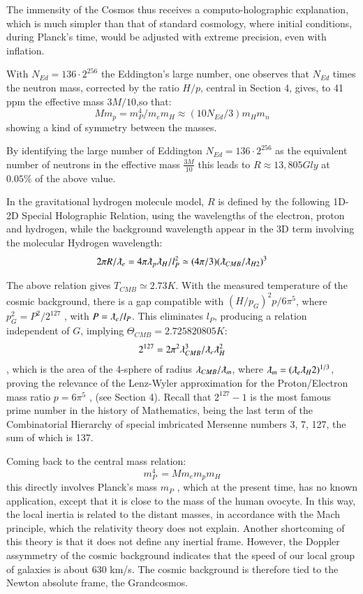 \documentclass[twoside,draft]{article}
\begin{document}
\begin{sloppypar}
{The immensity of the Cosmos thus receives a computo-holographic explanation, which is much simpler
than that of standard cosmology, where initial conditions, during Planck's time, would be adjusted with
extreme precision, even with inflation. 

With $N_{Ed} = 136 \cdot2^{256}$ the Eddington's large number, one observes that $N_{Ed}$ times the neutron mass, corrected by the ratio $H/p$, central in Section 4, gives, to 41 ppm the effective mass $3M/10$,so that:
\begin{equation}
Mm_p = m_P^4/m_em_H\approx(10N_{Ed}/3)m_Hm_n 
\end{equation}
showing a kind of symmetry between the masses.

By identifying the large number of Eddington $N_{Ed} = 136 \cdot
2^{256}$ as the equivalent number of neutrons in the effective mass $\frac{3M}{10}$ this leads to $R \approx 13,805 
Gly$ at $0.05\%$ of the above value.

In the gravitational hydrogen molecule model, $R$ is defined by the following 1D-2D Special
Holographic Relation, using the wavelengths of the electron, proton and hydrogen, while the background wavelength appear in the 3D term involving the molecular Hydrogen wavelength:
\begin{equation}
2 \pi R/\lambdabar_{e} = 4 \pi \lambdabar_{p} \lambdabar_{H} /l_{P}^2 \simeq (4\pi/3)(\lambdabar_{CMB} /\lambdabar_{H2})^{3}
\end{equation}

The above relation gives $T_{CMB} \simeq 2.73 K$. With the measured temperature of the cosmic
background, there is a gap compatible with $(H/p_G)^2 p/6\pi^5 $, where $p_{G}^{2} = P^{2} /2^{127}$ , with $P = \lambdabar_{e} /l_{P}$. 
This eliminates $l_{P}$, producing a relation independent of $G$, implying $\Theta_{CMB} = 2.725820805 K$:
$$2^{127} = 2\pi^{2} \lambda_{CMB}^{3} /\lambdabar_{e} \lambdabar_{H}^2$$
, which is the area of the 4-sphere of radius $\lambda_{CMB} / \lambdabar_{m}$, where $\lambdabar_{m} = (\lambdabar_{e} \lambdabar_{H} 2 )^{1/3} $, proving the relevance of
the Lenz-Wyler approximation for the Proton/Electron mass ratio $p = 6\pi^{5}$ , (see Section 4). Recall
that $2^{127} - 1$ is the most famous prime number in the history of Mathematics, being the last term of
the Combinatorial Hierarchy of special imbricated Mersenne numbers 3, 7, 127, the sum of which is 137.

Coming back to the central mass relation:
\begin{equation}
m_{P}^{4}\, = M m_{e} m_{p} m_{H}
\end{equation}
this directly involves Planck's mass $m_{P}$ , which at the present time, has no known application, except
that it is close to the mass of the human ovocyte. In this way, the local inertia is related to the distant
masses, in accordance with the Mach principle, which the relativity theory does not explain.
Another shortcoming of this theory is that it does not define any inertial frame. However, the
Doppler assymmetry of the cosmic background indicates that the speed of our local group of galaxies is about
630 km/s. The cosmic background is therefore tied to the Newton absolute frame, the Grandcosmos.

}
\end{sloppypar}
\end{document}

